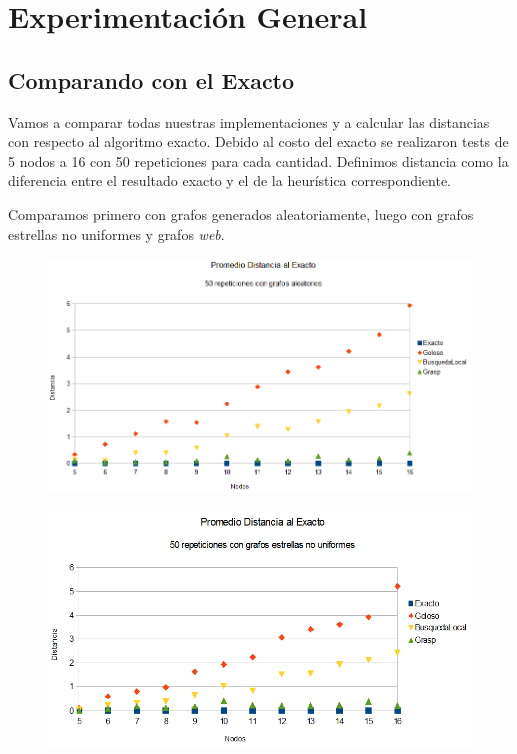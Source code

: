 \section{Experimentación General}


\subsection{Comparando con el Exacto}

\quad Vamos a comparar todas nuestras implementaciones y a calcular las distancias con respecto al algoritmo exacto. Debido al costo del exacto se realizaron tests de 5 nodos a 16 con 50 repeticiones para cada cantidad. Definimos distancia como la diferencia entre el resultado exacto y el de la heurística correspondiente. 


\quad Comparamos primero con grafos generados aleatoriamente, luego con grafos estrellas no uniformes y grafos \textit{web}.


\begin{figure}[H]
	\centering
	\includegraphics[scale=0.6]{distancia-Azar.png}
\end{figure}

\begin{figure}[H]
	\centering
	\includegraphics[scale=0.6]{distancia-Star.png}
\end{figure}

